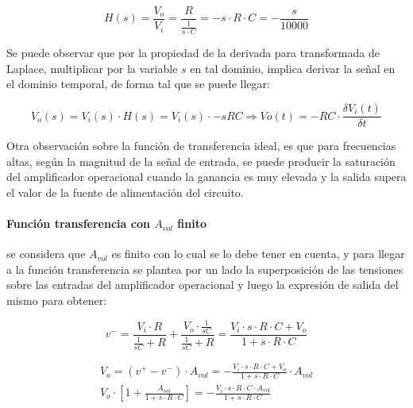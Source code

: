 \begin{equation}
	H(s) = \frac{V_o}{V_i} = \frac{R}{ \frac{1}{s \cdot C}} = -s \cdot R  \cdot C
	= -\frac{s}{10000}
\end{equation}

Se puede observar que por la propiedad de la derivada para transformada de Laplace, multiplicar por la variable $s$ en tal dominio, implica derivar la señal en el dominio temporal, de forma tal que se puede llegar:

\begin{equation*}
	V_o(s) = V_i(s) \cdot H(s) = V_i(s) \cdot -sRC \Rightarrow
	Vo(t) = -RC \cdot \frac{\delta V_i(t)}{\delta t}
\end{equation*}

Otra observaci\'on sobre la funci\'on de transferencia ideal, es que para frecuencias altas, seg\'un la magnitud de la se\~nal de entrada, se puede producir la saturaci\'on del amplificador operacional cuando la ganancia es muy elevada y la salida supera el valor de la fuente de alimentaci\'on del circuito.



\paragraph*{Funci\'on transferencia con $A_{vol}$ finito}se considera que $A_{vol}$ es finito con lo cual se lo debe tener en cuenta, y para llegar a la funci\'on transferencia se plantea por un lado la superposici\'on de las tensiones sobre las entradas del amplificador operacional y luego la expresi\'on de salida del mismo para obtener:

\begin{equation*}
	v^{-} = \frac{V_i \cdot R}{\frac{1}{sC} + R} + \frac{V_o \cdot \frac{1}{sC}}{\frac{1}{sC} + R}
	= \frac{V_i \cdot s \cdot R \cdot C + V_o}{1 + s \cdot R \cdot C}
\end{equation*}

\begin{align*}
	V_o = (v^{+} - v^{-}) \cdot A_{vol}
	= - \frac{V_i \cdot s \cdot R \cdot C + V_o}{1 + s \cdot R \cdot C} \cdot A_{vol} \\
	V_o \cdot \left[ 1 + \frac{A_{vol}}{1 + s \cdot R \cdot C} \right]
	= - \frac{V_i \cdot s \cdot R \cdot C \cdot A_{vol}}{1 + s \cdot R \cdot C}
\end{align*}

